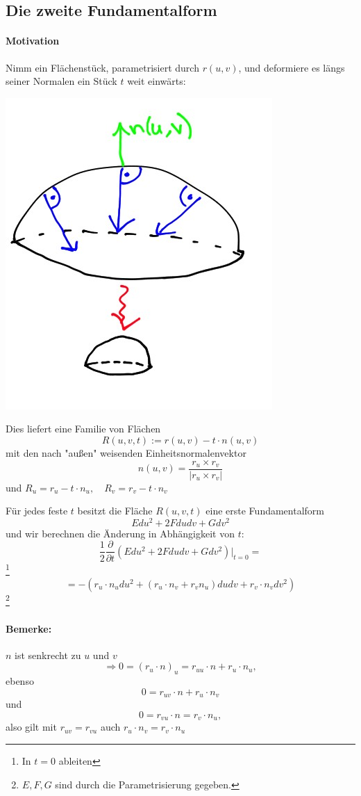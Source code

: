 \documentclass[a4paper,11pt,notitlepage]{report}
\theoremstyle{definition}
\begin{document}
\subsection{Die zweite Fundamentalform}
\paragraph{Motivation}
Nimm ein Flächenstück, parametrisiert durch $r(u,v)$, und deformiere es längs seiner Normalen ein Stück $t$ weit einwärts:  
	\begin{center}
		\includegraphics[scale=0.4]{images/2012_01_26_Bild2.jpg}
	\end{center}
Dies liefert eine Familie von Flächen
$$R(u,v,t) := r(u,v) - t \cdot n(u,v)$$
mit den nach "außen" weisenden Einheitsnormalenvektor
$$n(u,v) = \frac{r_u \times r_v}{|r_u \times r_v|}$$
und $R_u = r_u - t \cdot n_u, \quad R_v = r_v - t \cdot n_v$
\newline

Für jedes feste $t$ besitzt die Fläche $R(u,v,t)$ eine erste Fundamentalform
$$E du^2 + 2 F dudv + G dv^2$$
und wir berechnen die Änderung in Abhängigkeit von $t$: 
$$\frac{1}{2} \frac{\partial}{\partial t} (E du^2 + 2 F dudv + G dv^2) \big |_{t=0} = $$ \footnote{In $t=0$ ableiten}
$$= - (r_u \cdot n_u du^2 + (r_u \cdot n_v + r_v n_u) dudv + r_v \cdot n_v dv^2)$$
\footnote{$E, F, G$ sind durch die Parametrisierung gegeben.}

\paragraph{Bemerke:} $n$ ist senkrecht zu $u$ und $v$
$$\Rightarrow 0 = (r_u \cdot n)_u = r_{uu} \cdot n + r_u \cdot n_u,$$
ebenso
$$0 = r_{uv} \cdot n + r_u \cdot n_v$$ und
$$0 = r_{vu} \cdot n = r_v \cdot n_u,$$
also gilt mit $r_{uv} = r_{vu}$ auch $r_u \cdot n_v = r_v \cdot n_u$
\end{document}
